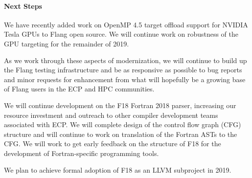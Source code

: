 \paragraph{Next Steps}
We have recently added work on OpenMP 4.5 target offload support for NVIDIA Tesla
GPUs to Flang open source.
We will continue work on robustness of the GPU targeting for the remainder of 2019.

As we work through these aspects of modernization, we will continue to build up the Flang
testing infrastructure and be as responsive as possible to bug reports and minor
requests for enhancement from what will hopefully be a growing base of Flang users
in the ECP and HPC communities.

We will continue development on the F18 Fortran 2018 parser, increasing our resource
investment and outreach to other compiler development teams associated with ECP.
We will complete design of the control flow graph (CFG) structure
and will continue to work on translation of the Fortran ASTs to the CFG.
We will work to get early feedback on the structure of F18 for the development
of Fortran-specific programming tools.

We plan to achieve formal adoption of F18 as an LLVM subproject in 2019.
